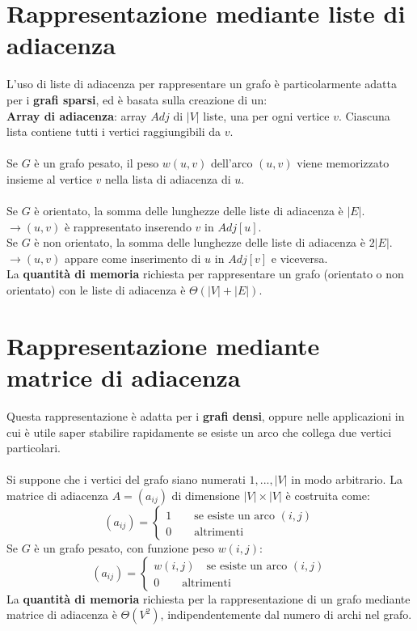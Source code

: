 \section{Rappresentazione mediante liste di adiacenza}
L'uso di liste di adiacenza per rappresentare un grafo è particolarmente adatta per i \textbf{grafi sparsi}, ed è basata sulla creazione di un:\\
\textbf{Array di adiacenza}: array $Adj$ di $|V|$ liste, una per ogni vertice $v$. Ciascuna lista contiene tutti i vertici raggiungibili da $v$.\\\\
Se $G$ è un grafo pesato, il peso $w(u,v)$ dell'arco $(u,v)$ viene memorizzato insieme al vertice $v$ nella lista di adiacenza di $u$.\\\\
Se $G$ è orientato, la somma delle lunghezze delle liste di adiacenza è $|E|$.\\
$\rightarrow (u,v)$ è rappresentato inserendo $v$ in $Adj[u]$.\\
Se $G$ è non orientato, la somma delle lunghezze delle liste di adiacenza è $2|E|$.\\
$\rightarrow (u,v)$ appare come inserimento di $u$ in $Adj[v]$ e viceversa.\\
La \textbf{quantità di memoria} richiesta per rappresentare un grafo (orientato o non orientato) con le liste di adiacenza è $\Theta(|V| + |E|)$. 

\section{Rappresentazione mediante matrice di adiacenza}
Questa rappresentazione è adatta per i \textbf{grafi densi}, oppure nelle applicazioni in cui è utile saper stabilire rapidamente se esiste un arco che collega due vertici particolari.\\\\
Si suppone che i vertici del grafo siano numerati $1, ..., |V|$ in modo arbitrario. La matrice di adiacenza $A = (a_{ij})$ di dimensione $|V|\times|V|$ è costruita come:
    \begin{equation}
        (a_{ij}) = 
        \begin{cases}
            1   \qquad  \text{se esiste un arco } (i, j)\\
            0   \qquad  \text{altrimenti}   
        \end{cases}
    \end{equation}
Se $G$ è un grafo pesato, con funzione peso $w(i,j)$:
    \begin{equation}
        (a_{ij}) =
        \begin{cases}
            w(i,j)   \quad  \text{se esiste un arco } (i, j)\\
            0   \qquad  \text{altrimenti}   
        \end{cases}
    \end{equation}
La \textbf{quantità di memoria} richiesta per la rappresentazione di un grafo mediante matrice di adiacenza è $\Theta(V^2)$, indipendentemente dal numero di archi nel grafo.

